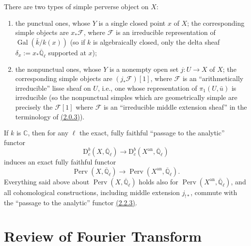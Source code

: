 There are two types of simple perverse object on \(X\):
\begin{enumerate}[label=(\arabic*)]
\item the punctual ones, whose \(Y\) is a single closed point \(x\) of \(X\);
the corresponding simple objects are \(x_*\mathcal{F}\), where
\(\mathcal{F}\) is an irreducible representation of
\(\operatorname{Gal}(\bar{k}/k(x))\) (so if \(k\) is algebraically closed, only
the delta sheaf \(\delta_x:=x_*\overline{\mathbb{Q}}_\ell\) supported at
\(x\));
\item the nonpunctual ones, whose \(Y\) is a nonempty open set \(j:U\to X\) of
\(X\); the corresponding simple objects are \((j_*\mathcal{F})[1]\), where
\(\mathcal{F}\) is an ``arithmetically irreducible'' lisse sheaf on \(U\),
i.e., one whose representation of \(\pi_1(U,\bar{u})\) is irreducible (so the
nonpunctual simples which are geometrically simple are precisely the
\(\mathcal{F}[1]\) where \(\mathcal{F}\) is an ``irreducible middle extension
sheaf'' in the terminology of \hyperref[par:2.0.3]{(2.0.3)}).
\end{enumerate}

If \(k\) is \(\mathbb{C}\), then for any \(\ell\) the exact, fully faithful
``passage to the analytic'' functor
\[
  \mathrm{D}^b_c(X,\overline{\mathbb{Q}}_\ell)\to
  \mathrm{D}^b_c(X^{\mathrm{an}},\overline{\mathbb{Q}}_\ell)
\]
induces an exact fully faithful functor
\[
  \operatorname{Perv}(X,\overline{\mathbb{Q}}_\ell)\to
  \operatorname{Perv}(X^{\mathrm{an}},\overline{\mathbb{Q}}_\ell).
\]
Everything said above about
\(\operatorname{Perv}(X,\overline{\mathbb{Q}}_\ell)\) holds also for
\(\operatorname{Perv}(X^{\mathrm{an}},\overline{\mathbb{Q}}_\ell)\), and all
cohomological constructions, including middle extension \(j_{!*}\), commute
with the ``passage to the analytic'' functor \hyperref[par:2.2.3]{(2.2.3)}.

\section{Review of Fourier Transform}
\label{sec:2.4}

